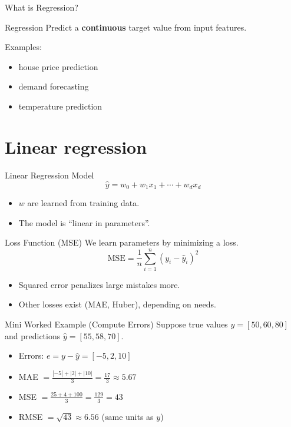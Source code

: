 \documentclass[aspectratio=169]{beamer}
\begin{document}
\begin{frame}{What is Regression?}
  \begin{block}{Regression}
    Predict a \textbf{continuous} target value from input features.
  \end{block}
  \vspace{0.4em}
  Examples:
  \begin{itemize}[<+->]
    \item house price prediction
    \item demand forecasting
    \item temperature prediction
  \end{itemize}
\end{frame}

\section{Linear regression}
\label{sec:linear}

\begin{frame}{Linear Regression Model}
  \[
    \hat{y} = w_0 + w_1 x_1 + \cdots + w_d x_d
  \]
  \begin{itemize}[<+->]
    \item $w$ are learned from training data.
    \item The model is ``linear in parameters''.
  \end{itemize}
\end{frame}

\begin{frame}{Loss Function (MSE)}
  We learn parameters by minimizing a loss.
  \[
    \text{MSE} = \frac{1}{n}\sum_{i=1}^{n}(y_i - \hat{y}_i)^2
  \]
  \begin{itemize}[<+->]
    \item Squared error penalizes large mistakes more.
    \item Other losses exist (MAE, Huber), depending on needs.
  \end{itemize}
\end{frame}

\begin{frame}{Mini Worked Example (Compute Errors)}
  Suppose true values $y=[50,60,80]$ and predictions $\hat{y}=[55,58,70]$.
  \begin{itemize}[<+->]
    \item Errors: $e = y-\hat{y} = [-5,2,10]$
    \item MAE $= \frac{|{-5}|+|2|+|10|}{3}=\frac{17}{3}\approx 5.67$
    \item MSE $= \frac{25+4+100}{3}=\frac{129}{3}=43$
    \item RMSE $= \sqrt{43}\approx 6.56$ (same units as $y$)
  \end{itemize}
\end{frame}
\end{document}
